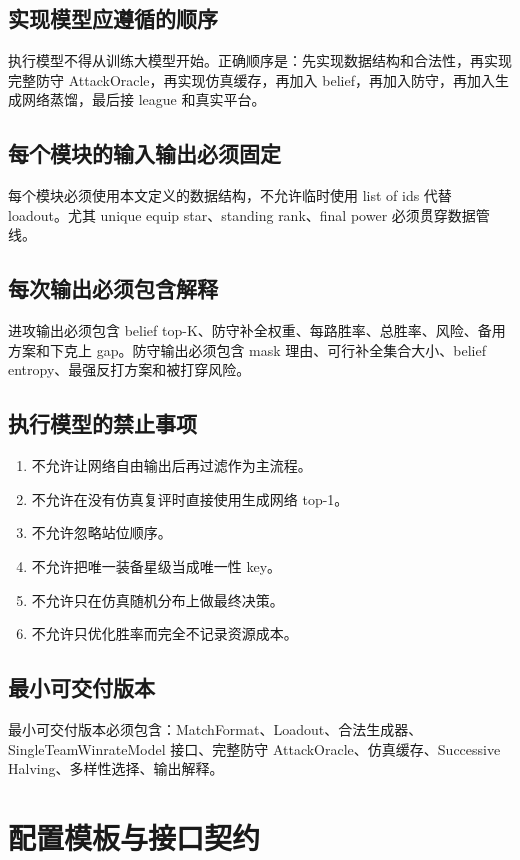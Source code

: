 \documentclass[UTF8,12pt,openany]{ctexbook}
\begin{document}
\section{实现模型应遵循的顺序}
执行模型不得从训练大模型开始。正确顺序是：先实现数据结构和合法性，再实现完整防守 AttackOracle，再实现仿真缓存，再加入 belief，再加入防守，再加入生成网络蒸馏，最后接 league 和真实平台。

\section{每个模块的输入输出必须固定}
每个模块必须使用本文定义的数据结构，不允许临时使用 list of ids 代替 loadout。尤其 unique equip star、standing rank、final power 必须贯穿数据管线。

\section{每次输出必须包含解释}
进攻输出必须包含 belief top-K、防守补全权重、每路胜率、总胜率、风险、备用方案和下克上 gap。防守输出必须包含 mask 理由、可行补全集合大小、belief entropy、最强反打方案和被打穿风险。

\section{执行模型的禁止事项}
\begin{enumerate}[leftmargin=2em]
\item 不允许让网络自由输出后再过滤作为主流程。
\item 不允许在没有仿真复评时直接使用生成网络 top-1。
\item 不允许忽略站位顺序。
\item 不允许把唯一装备星级当成唯一性 key。
\item 不允许只在仿真随机分布上做最终决策。
\item 不允许只优化胜率而完全不记录资源成本。
\end{enumerate}

\section{最小可交付版本}
最小可交付版本必须包含：MatchFormat、Loadout、合法生成器、SingleTeamWinrateModel 接口、完整防守 AttackOracle、仿真缓存、Successive Halving、多样性选择、输出解释。


\chapter{配置模板与接口契约}
\end{document}
